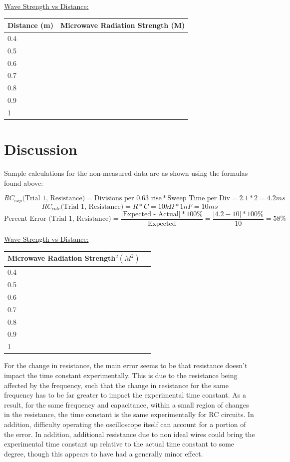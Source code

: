 \documentclass[11pt, titlepage]{article}
\begin{document}
\underline{Wave Strength vs Distance:}
\begin{center}
\begin{tabular}
{|m{9em}|m{12em}|}
\hline
Distance (m) & Microwave Radiation Strength (M) \\
\hline
0.4 & \\
\hline
0.5 & \\
\hline
0.6 & \\
\hline
0.7 & \\
\hline
0.8 & \\
\hline
0.9 & \\
\hline
1 & \\
\hline
\end{tabular}
\end{center}

\section*{Discussion}
Sample calculations for the non-measured data are as shown using the formulas found above:

$$RC_{exp} \text{(Trial 1, Resistance)} = \text{Divisions per 0.63 rise} * \text{Sweep Time per Div} = 2.1 * 2 = 4.2 ms$$
$$RC_{calc} \text{(Trial 1, Resistance)} = R * C = 10k \Omega * 1 nF = 10 ms$$
$$\text{Percent Error (Trial 1, Resistance)} = \frac{\text{$|$Expected - Actual$|$} * 100\%}{\text{Expected}} = \frac{|4.2 - 10| * 100\%}{10} = 58\%$$

\underline{Wave Strength vs Distance:}
\begin{center}
\begin{tabular}
{|m{9em}|m{12em}|}
\hline
Microwave Radiation Strength$^2 (M^2)$ & \\
\hline
0.4 & \\
\hline
0.5 & \\
\hline
0.6 & \\
\hline
0.7 & \\
\hline
0.8 & \\
\hline
0.9 & \\
\hline
1 & \\
\hline
\end{tabular}
\end{center}

For the change in resistance, the main error seems to be that resistance doesn't impact the time constant experimentally. This is due to the resistance being affected by the frequency, such that the change in resistance for the same frequency has to be far greater to impact the experimental time constant. As a result, for the same frequency and capacitance, within a small region of changes in the resistance, the time constant is the same experimentally for RC circuits. In addition, difficulty operating the oscilloscope itself can account for a portion of the error. In addition, additional resistance due to non ideal wires could bring the experimental time constant up relative to the actual time constant to some degree, though this appears to have had a generally minor effect. 
\end{document}
